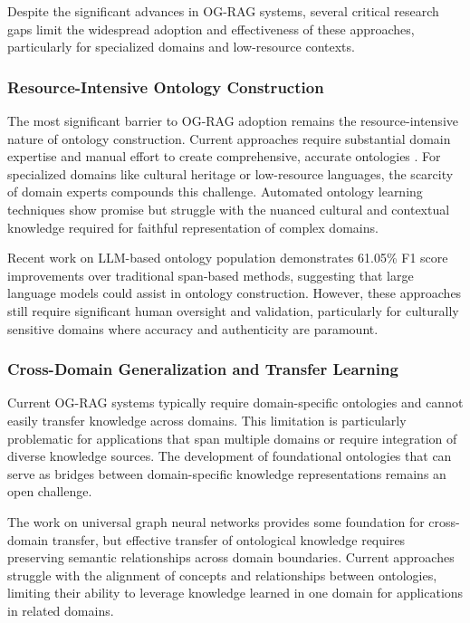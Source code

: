 Despite the significant advances in OG-RAG systems, several critical research gaps limit the widespread adoption and effectiveness of these approaches, particularly for specialized domains and low-resource contexts.

\subsubsection{Resource-Intensive Ontology Construction}

The most significant barrier to OG-RAG adoption remains the resource-intensive nature of ontology construction. Current approaches require substantial domain expertise and manual effort to create comprehensive, accurate ontologies \cite{fernandez2019ontology}. For specialized domains like cultural heritage or low-resource languages, the scarcity of domain experts compounds this challenge. Automated ontology learning techniques show promise but struggle with the nuanced cultural and contextual knowledge required for faithful representation of complex domains.

Recent work on LLM-based ontology population \cite{agarwal2024llm} demonstrates 61.05\% F1 score improvements over traditional span-based methods, suggesting that large language models could assist in ontology construction. However, these approaches still require significant human oversight and validation, particularly for culturally sensitive domains where accuracy and authenticity are paramount.

\subsubsection{Cross-Domain Generalization and Transfer Learning}

Current OG-RAG systems typically require domain-specific ontologies and cannot easily transfer knowledge across domains. This limitation is particularly problematic for applications that span multiple domains or require integration of diverse knowledge sources. The development of foundational ontologies that can serve as bridges between domain-specific knowledge representations remains an open challenge.

The work on universal graph neural networks \cite{you2021graph} provides some foundation for cross-domain transfer, but effective transfer of ontological knowledge requires preserving semantic relationships across domain boundaries. Current approaches struggle with the alignment of concepts and relationships between ontologies, limiting their ability to leverage knowledge learned in one domain for applications in related domains.

